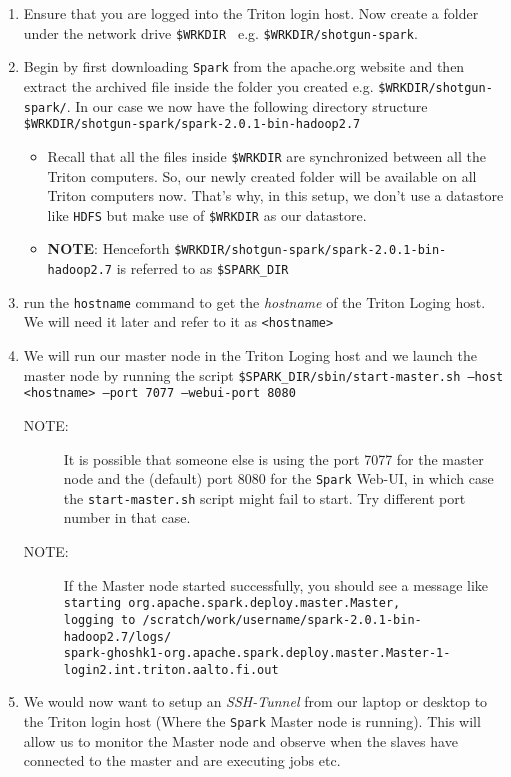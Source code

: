 \documentclass[a4paper,11pt]{article}
\begin{document}
\begin{enumerate}
	\item Ensure that you are logged into the Triton login host. Now create a folder under the network drive \texttt{\$WRKDIR } e.g. \texttt{\$WRKDIR/shotgun-spark}.
	\item Begin by first downloading \texttt{Spark} from the apache.org website and then extract the archived file inside the folder you created e.g. \texttt{\$WRKDIR/shotgun-spark/}. In our case we now have the following directory structure \texttt{\$WRKDIR/shotgun-spark/spark-2.0.1-bin-hadoop2.7}
	\begin{itemize}
		\item Recall that all the files inside \texttt{\$WRKDIR} are synchronized between all the Triton computers. So, our newly created folder will be available on all Triton computers now. That's why, in this setup, we don't use a datastore like \texttt{HDFS} but make use of \texttt{\$WRKDIR} as our datastore.
		\item \textbf{NOTE}: Henceforth \texttt{\$WRKDIR/shotgun-spark/spark-2.0.1-bin-hadoop2.7} is referred to as \texttt{\$SPARK\_DIR}
	\end{itemize}
	\item run the \texttt{hostname} command to get the \textit{hostname} of the Triton Loging host. We will need it later and refer to it as \texttt{<hostname>}
	\item We will run our master node in the Triton Loging host and we launch the master node by running the script \texttt{\$SPARK\_DIR/sbin/start-master.sh --host <hostname>  --port 7077 --webui-port 8080} 
	\begin{description}
		\item[NOTE:] It is possible that someone else is using the port 7077 for the master node and the (default) port 8080 for the \texttt{Spark} Web-UI, in which case the \texttt{start-master.sh} script might fail to start. Try different port number in that case.
		\item[NOTE:] If the Master node started successfully, you should see a message like \\\texttt{starting org.apache.spark.deploy.master.Master, \\
			logging to /scratch/work/username/spark-2.0.1-bin-hadoop2.7/logs/\\
			spark-ghoshk1-org.apache.spark.deploy.master.Master-1-login2.int.triton.aalto.fi.out}
	\end{description}
	\item We would now want to setup an \textit{SSH-Tunnel} from our laptop or desktop to the Triton login host (Where the \texttt{Spark} Master node is running). This will allow us to monitor the Master node and observe when the slaves have connected to the master and are executing jobs etc.

\end{enumerate}
\end{document}
